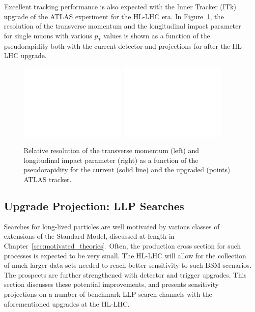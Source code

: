 Excellent tracking performance is also expected with the Inner Tracker (ITk) upgrade of the ATLAS experiment for the HL-LHC era.
In Figure~\ref{fig:atlastrackres}, the resolution of the transverse momentum and the longitudinal impact parameter for single muons with various $p_T$ values is shown as a function of the pseudorapidity both with the current
detector and projections for after the HL-LHC upgrade.

\begin{figure}[h!tbp]
\begin{center}
  \includegraphics[width=0.47\textwidth]{figures/ch03_fig_006e.pdf}
  \includegraphics[width=0.47\textwidth]{figures/ch03_fig_006b.pdf}
  \caption{Relative resolution of the transverse momentum (left) and longitudinal impact parameter (right) as a function of the pseudorapidity for the current (solid line) and the upgraded (points) ATLAS tracker.}
  \label{fig:atlastrackres}
\end{center}
\end{figure}

\subsection{Upgrade Projection: LLP Searches} \label{sec:upgradesearch}


Searches for long-lived particles are well motivated by various classes of extensions of the Standard Model, discussed at length in Chapter~\ref{sec:motivated_theories}. Often, the production cross section for such processes is expected to be very small. The HL-LHC will allow for the collection of much larger data sets needed to reach better sensitivity to such BSM scenarios. The prospects are further strengthened with detector and trigger upgrades. This section discusses these potential improvements, and presents sensitivity projections on a number of benchmark LLP search channels with the aforementioned upgrades at the HL-LHC.

